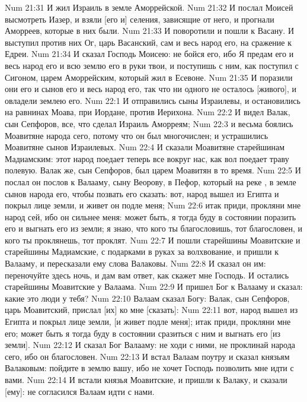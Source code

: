 \vs Num 21:31 И жил Израиль в земле Аморрейской.
\vs Num 21:32 И послал Моисей высмотреть Иазер, и взяли [его и] селения, зависящие от него, и прогнали Аморреев, которые в них были.
\vs Num 21:33 И поворотили и пошли к Васану. И выступил против них Ог, царь Васанский, сам и весь народ его, на сражение к Едреи.
\rsbpar\vs Num 21:34 И сказал Господь Моисею: не бойся его, ибо Я предам его и весь народ его и всю землю его в руки твои, и поступишь с ним, как поступил с Сигоном, царем Аморрейским, который жил в Есевоне.
\vs Num 21:35 И поразили они его и сынов его и весь народ его, так что ни одного не осталось [живого], и овладели землею его.
\vs Num 22:1 И отправились сыны Израилевы, и остановились на равнинах Моава, при Иордане, против Иерихона.
\rsbpar\vs Num 22:2 И видел Валак, сын Сепфоров, все, что сделал Израиль Аморреям;
\vs Num 22:3 и весьма боялись Моавитяне народа сего, потому что он был многочислен; и устрашились Моавитяне сынов Израилевых.
\vs Num 22:4 И сказали Моавитяне старейшинам Мадиамским: этот народ поедает теперь все вокруг нас, как вол поедает траву полевую. Валак же, сын Сепфоров, был царем Моавитян в то время.
\vs Num 22:5 И послал он послов к Валааму, сыну Веорову, в Пефор, который на реке , в земле сынов народа его, чтобы позвать его  сказать: вот, народ вышел из Египта и покрыл лице земли, и живет он подле меня;
\vs Num 22:6 итак приди, прокляни мне народ сей, ибо он сильнее меня: может быть, я тогда буду в состоянии поразить его и выгнать его из земли; я знаю, что кого ты благословишь, тот благословен, и кого ты проклянешь, тот проклят.
\vs Num 22:7 И пошли старейшины Моавитские и старейшины Мадиамские, с подарками в руках за волхвование, и пришли к Валааму, и пересказали ему слова Валаковы.
\vs Num 22:8 И сказал он им: переночуйте здесь ночь, и дам вам ответ, как скажет мне Господь. И остались старейшины Моавитские у Валаама.
\vs Num 22:9 И пришел Бог к Валааму и сказал: какие это люди у тебя?
\vs Num 22:10 Валаам сказал Богу: Валак, сын Сепфоров, царь Моавитский, прислал [их] ко мне [сказать]:
\vs Num 22:11 вот, народ вышел из Египта и покрыл лице земли, [и живет подле меня]; итак приди, прокляни мне его; может быть я тогда буду в состоянии сразиться с ним и выгнать его [из земли].
\vs Num 22:12 И сказал Бог Валааму: не ходи с ними, не проклинай народа сего, ибо он благословен.
\vs Num 22:13 И встал Валаам поутру и сказал князьям Валаковым: пойдите в землю вашу, ибо не хочет Господь позволить мне идти с вами.
\vs Num 22:14 И встали князья Моавитские, и пришли к Валаку, и сказали [ему]: не согласился Валаам идти с нами.
